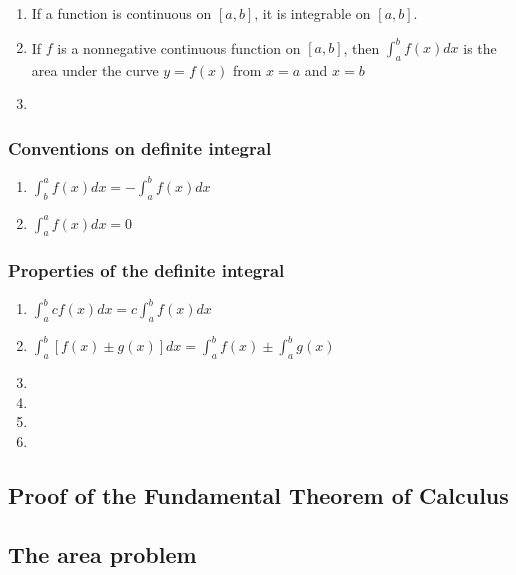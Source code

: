 \documentclass[
]{article}
\begin{document}
\begin{enumerate}
\def\labelenumi{\arabic{enumi}.}
\item
  If a function is continuous on \([a,b]\), it is integrable on
  \([a,b]\).
\item
  If \(f\) is a nonnegative continuous function on \([a,b]\), then
  \(\int_a^b f(x)dx\) is the area under the curve \(y=f(x)\) from
  \(x=a\) and \(x=b\)
\item
\end{enumerate}

\hypertarget{conventions-on-definite-integral}{%
\subsubsection{Conventions on definite
integral}\label{conventions-on-definite-integral}}

\begin{enumerate}
\def\labelenumi{\arabic{enumi}.}
\item
  \(\int_b^a f(x)dx = -\int_a^b f(x)dx\)
\item
  \(\int_a^a f(x)dx = 0\)
\end{enumerate}

\hypertarget{properties-of-the-definite-integral}{%
\subsubsection{Properties of the definite
integral}\label{properties-of-the-definite-integral}}

\begin{enumerate}
\def\labelenumi{\arabic{enumi}.}
\item
  \(\int_a^b cf(x)dx = c\int_a^b f(x)dx\)
\item
  \(\int_a^b [f(x) \pm g(x)] dx = \int_a^b f(x) \pm \int_a^b g(x)\)
\item
\item
\item
\item
\end{enumerate}

\hypertarget{proof-of-the-fundamental-theorem-of-calculus}{%
\subsection{Proof of the Fundamental Theorem of
Calculus}\label{proof-of-the-fundamental-theorem-of-calculus}}

\hypertarget{the-area-problem-1}{%
\subsection{The area problem}\label{the-area-problem-1}}
\end{document}
